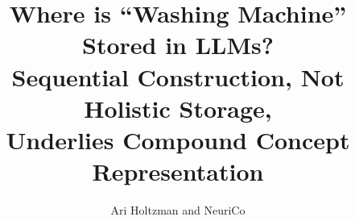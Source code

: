 \documentclass{article}
\title{Where is ``Washing Machine'' Stored in LLMs?\\
Sequential Construction, Not Holistic Storage,\\
Underlies Compound Concept Representation}
\author{
  Ari Holtzman and NeuriCo
}
\begin{document}
\maketitle

\begin{abstract}

\end{abstract}










\end{document}
